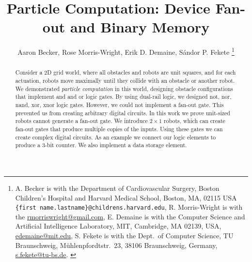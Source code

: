 \documentclass[letterpaper, 10 pt, conference]{ieeeconf}
\begin{document}


\title{\LARGE \bf 
Particle Computation:  Device Fan-out and Binary Memory 
}
\author{Aaron Becker,
Rose Morris-Wright,
Erik D. Demaine,
S\'andor P. Fekete
\thanks{{A. Becker is with the Department of Cardiovascular Surgery,  Boston Children's Hospital and Harvard Medical School, Boston, MA, 02115 USA {\tt\small \{first name.lastname\}@childrens.harvard.edu}, 
R. Morris-Wright is with the   \protect\url{rmorriswright@gmail.com},
E. Demaine is with the Computer Science and Artificial Intelligence Laboratory, MIT,
     Cambridge, MA 02139, USA,      \protect\url{edemaine@mit.edu},
S. Fekete is with the Dept.~of Computer Science, TU Braunschweig,  M\"uhlenpfordtstr.~23, 38106 Braunschweig, Germany,
      \protect\url{s.fekete@tu-bs.de}.
}
} %
} %
\maketitle



\begin{abstract} %
Consider a 2D grid world, where all obstacles and robots are unit squares, and for each actuation, robots move maximally until they collide with an obstacle or another robot. We demonstrated \emph{particle computation} in this world, designing obstacle configurations that implement {\sc and} and {\sc or} logic gates.  By using dual-rail logic, we designed {\sc not, nor, nand, xor, xnor} logic gates.  However, we could not implement a {\sc fan-out} gate. This prevented us from creating arbitrary digital circuits.  In this work we prove unit-sized robots cannot generate a {\sc fan-out} gate.  We introduce $2\times 1$ robots, which can create fan-out gates that produce multiple copies of the inputs.  Using these gates we can create complex digital circuits.  As an example we connect our logic elements to produce a 3-bit counter.
   We also implement a data storage element.
\end{abstract}
\end{document}
